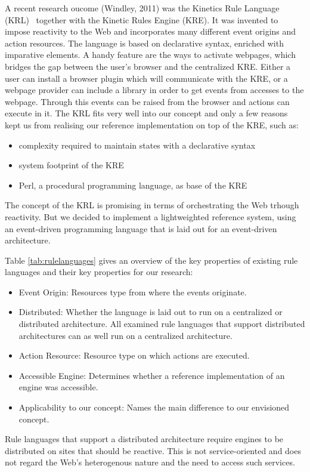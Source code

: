 A recent research oucome (Windley, 2011) was the \textrm{Kinetics Rule Language} (\textrm{KRL})~\cite{bookTheLiveWeb} together with the \textrm{Kinetic Rules Engine} (\textrm{KRE}).
It was invented to impose reactivity to the Web and incorporates many different event origins and action resources.
The language is based on declarative syntax, enriched with imparative elements.
A handy feature are the ways to activate webpages, which bridges the gap between the user's browser and the centralized \textrm{KRE}.
Either a user can install a browser plugin which will communicate with the \textrm{KRE}, or a webpage provider can include a library in order to get events from accesses to the webpage.
Through this events can be raised from the browser and actions can execute in it.
The \textrm{KRL} fits very well into our concept and only a few reasons kept us from realising our reference implementation on top of the \textrm{KRE}, such as:
\begin{itemize}
  \item complexity required to maintain states with a declarative syntax 
  \item system footprint of the \textrm{KRE}
  \item \textrm{Perl}, a procedural programming language, as base of the \textrm{KRE}
\end{itemize}
The concept of the \textrm{KRL} is promising in terms of orchestrating the Web trhough reactivity.
But we decided to implement a lightweighted reference system, using an event-driven programming language that is laid out for an event-driven architecture. 

Table \ref{tab:rulelanguages} gives an overview of the key properties of existing rule languages and their key properties for our research:
\begin{itemize}
  \item \textrm{Event Origin}: Resources type from where the events originate.
  \item \textrm{Distributed}: Whether the language is laid out to run on a centralized or distributed architecture. All examined rule languages that support distributed architectures can as well run on a centralized architecture.
  \item \textrm{Action Resource}: Resource type on which actions are executed.
  \item \textrm{Accessible Engine}: Determines whether a reference implementation of an engine was accessible.
  \item \textrm{Applicability to our concept}: Names the main difference to our envisioned concept.
\end{itemize}
Rule languages that support a distributed architecture require engines to be distributed on sites that should be reactive.
This is not service-oriented and does not regard the Web's heterogenous nature and the need to access such services.

